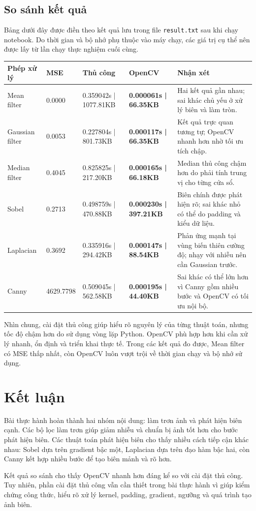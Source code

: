 \documentclass[12pt,a4paper]{article}
\begin{document}
\subsection{So sánh kết quả}

Bảng dưới đây được điền theo kết quả lưu trong file \texttt{result.txt} sau khi chạy notebook. Do thời gian và bộ nhớ phụ thuộc vào máy chạy, các giá trị cụ thể nên được lấy từ lần chạy thực nghiệm cuối cùng.

\begin{longtable}{p{}p{}p{}p{}p{}}
\toprule
\textbf{Phép xử lý} & \textbf{MSE} & \textbf{Thủ công} & \textbf{OpenCV} & \textbf{Nhận xét} \\
\midrule
Mean filter & 0.0000 & 0.359042s | 1077.81KB & \textbf{0.000061s | 66.35KB} & Hai kết quả gần nhau; sai khác chủ yếu ở xử lý biên và làm tròn. \\
Gaussian filter & 0.0053 & 0.227804s | 801.73KB & \textbf{0.000117s | 66.35KB} & Kết quả trực quan tương tự; OpenCV nhanh hơn nhờ tối ưu tích chập. \\
Median filter & 0.4045 & 0.825825s | 217.20KB & \textbf{0.000165s | 66.18KB} & Median thủ công chậm hơn do phải tính trung vị cho từng cửa sổ. \\
Sobel & 0.2713 & 0.498759s | 470.88KB & \textbf{0.000230s | 397.21KB} & Biên chính được phát hiện rõ; sai khác nhỏ có thể do padding và kiểu dữ liệu. \\
Laplacian & 0.3692 & 0.335916s | 294.42KB & \textbf{0.000147s | 88.54KB} & Phản ứng mạnh tại vùng biến thiên cường độ; nhạy với nhiễu nên cần Gaussian trước. \\
Canny & 4629.7798 & 0.509045s | 562.58KB & \textbf{0.000195s | 44.40KB} & Sai khác có thể lớn hơn vì Canny gồm nhiều bước và OpenCV có tối ưu nội bộ. \\
\bottomrule
\end{longtable}

Nhìn chung, cài đặt thủ công giúp hiểu rõ nguyên lý của từng thuật toán, nhưng tốc độ chậm hơn do sử dụng vòng lặp Python. OpenCV phù hợp hơn khi cần xử lý nhanh, ổn định và triển khai thực tế. Trong các kết quả đo được, Mean filter có MSE thấp nhất, còn OpenCV luôn vượt trội về thời gian chạy và bộ nhớ sử dụng.

\section{Kết luận}

Bài thực hành hoàn thành hai nhóm nội dung: làm trơn ảnh và phát hiện biên cạnh. Các bộ lọc làm trơn giúp giảm nhiễu và chuẩn bị ảnh tốt hơn cho bước phát hiện biên. Các thuật toán phát hiện biên cho thấy nhiều cách tiếp cận khác nhau: Sobel dựa trên gradient bậc một, Laplacian dựa trên đạo hàm bậc hai, còn Canny kết hợp nhiều bước để tạo biên mảnh và rõ hơn.

Kết quả so sánh cho thấy OpenCV nhanh hơn đáng kể so với cài đặt thủ công. Tuy nhiên, phần cài đặt thủ công vẫn cần thiết trong bài thực hành vì giúp kiểm chứng công thức, hiểu rõ xử lý kernel, padding, gradient, ngưỡng và quá trình tạo ảnh biên.
\end{document}
